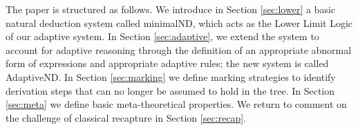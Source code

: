 \documentclass[]{article}
\begin{document}

The paper is structured as follows. We introduce in Section \ref{sec:lower} a basic natural deduction system called {\sf minimalND}, which acts as the Lower Limit Logic of our adaptive system. In Section \ref{sec:adaptive}, we extend the system to account for adaptive reasoning through the definition of an appropriate abnormal form of expressions and appropriate adaptive rules; the new system is called {\sf AdaptiveND}. In Section \ref{sec:marking} we define marking strategies to identify derivation steps that can no longer be assumed to hold in the tree. In Section \ref{sec:meta} we define basic meta-theoretical properties. We return to comment on the challenge of classical recapture in Section \ref{sec:recap}.


\end{document}
